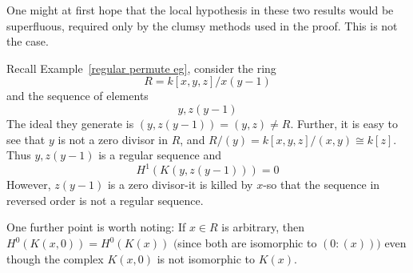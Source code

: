 One might at first hope that the local hypothesis in these two results
would be superfluous, required only by the clumsy methods used in the
proof. This is not the case.
\begin{example}
Recall Example~\ref{regular permute eg}, consider the ring
\[R=k[x,y,z]/x(y-1)\]
and the sequence of elements
\[y,z(y-1)\]
The ideal they generate is $(y,z(y-1))=(y,z)\neq R$. Further, it is easy to
see that $y$ is not a zero divisor in $R$, and $R/(y)=k[x,y,z]/(x,y)\cong k[z]$. Thus $y,z(y-1)$ is a regular sequence and
\[H^1(K(y,z(y-1)))=0\]
However, $z(y-1)$ is a zero divisor-it is killed by $x$-so that the sequence in reversed order is not a regular sequence.\par
One further point is worth noting: If $x\in R$ is arbitrary, then $H^0(K(x,0))=H^0(K(x))$ $($since both are isomorphic to $(0:(x)))$ even though the complex $K(x,0)$ is not isomorphic to $K(x)$.
\end{example}
